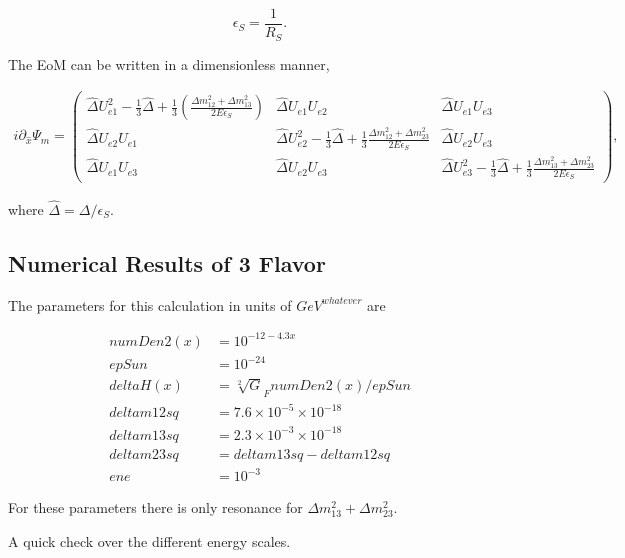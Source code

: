 \documentclass{tufte-handout}
\begin{document}
\begin{equation*}
\epsilon_S = \frac{1}{R_S}.
\end{equation*}

The EoM can be written in a dimensionless manner,

\begin{align*}
i\partial_{\hat x} \Psi_{m} =  \begin{pmatrix}
\hat\Delta U_{e1}^2 - \frac{1}{3}\hat\Delta + \frac{1}{3}(\frac{\Delta m_{12}^2 + \Delta m_{13}^2}{2E\epsilon_S}) & \hat\Delta U_{e1}U_{e2} & \hat\Delta U_{e1} U_{e3} \\
\hat\Delta U_{e2} U_{e1} & \hat\Delta U_{e2}^2 -\frac{1}{3}\hat\Delta + \frac{1}{3}\frac{\Delta m_{12}^2 + \Delta m_{23}^2}{2E\epsilon_S} & \hat\Delta U_{e2}U_{e3} \\
\hat\Delta U_{e1} U_{e3} & \hat\Delta U_{e2} U_{e3} & \hat\Delta U_{e3}^2 -\frac{1}{3} \hat\Delta + \frac{1}{3} \frac{\Delta m_{13}^2 + \Delta m_{23}^2 }{2E\epsilon_S} 
\end{pmatrix},
\end{align*}

where $\hat\Delta = \Delta/\epsilon_S$.


\subsection{Numerical Results of 3 Flavor}


The parameters for this calculation in units of $GeV^{whatever}$ are

\begin{align*}
numDen2(x) &= 10^{-12 - 4.3 x} \\
epSun &= 10^{-24}\\
deltaH(x) &= \sqrt[2] G_F numDen2(x)/epSun\\
deltam12sq &= 7.6\times 10^{-5}\times 10^{-18}\\
deltam13sq &= 2.3\times 10^{-3}\times 10^{-18}\\
deltam23sq &= deltam13sq - deltam12sq\\
ene &= 10^{-3}
\end{align*}

For these parameters there is only resonance for $\Delta m_{13}^2+\Delta m_{23}^2$.

A quick check over the different energy scales.
\end{document}
